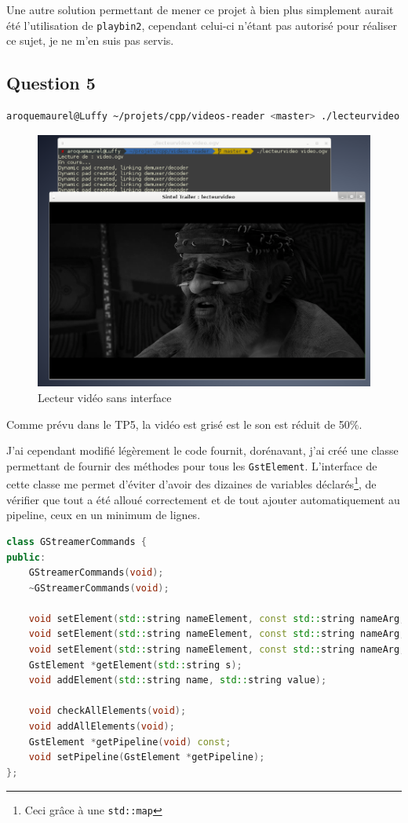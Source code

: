 \documentclass[a4paper, 11pt]{article}
\begin{document}
	Une autre solution permettant de mener ce projet à bien plus simplement aurait été l'utilisation de \texttt{playbin2}, cependant celui-ci n'étant pas
	autorisé pour réaliser ce sujet, je ne m'en suis pas
	servis. 

	\subsection{Question 5}
	\begin{lstlisting}[language=sh]
 aroquemaurel@Luffy ~/projets/cpp/videos-reader <master> ./lecteurvideo video.ogv 
	\end{lstlisting}
	\begin{figure}[H]
		\centering
		\includegraphics[width=17cm]{img/1.png}
		\caption{Lecteur vidéo sans interface}
	\end{figure}
	Comme prévu dans le TP5, la vidéo est grisé est le son est réduit de 50\%. 

	J'ai cependant modifié légèrement le code fournit, dorénavant, j'ai créé une classe permettant de fournir des méthodes pour tous les \texttt{GstElement}.
	L'interface de cette classe me permet d'éviter d'avoir des dizaines de variables déclarés\footnote{Ceci grâce à une \texttt{std::map}}, de vérifier que tout a été alloué correctement et de tout ajouter
	automatiquement au pipeline, ceux en un minimum de lignes.
	
	\begin{lstlisting}[language=C++, caption=Interface de gestion des commandes GStreamer]
class GStreamerCommands {
public:
	GStreamerCommands(void);
	~GStreamerCommands(void);

	void setElement(std::string nameElement, const std::string nameArg, const std::string valuePropertie);
	void setElement(std::string nameElement, const std::string nameArg, const double valuePropertie);
	void setElement(std::string nameElement, const std::string nameArg, const bool valuePropertie);
	GstElement *getElement(std::string s);
	void addElement(std::string name, std::string value);

	void checkAllElements(void);
	void addAllElements(void);
	GstElement *getPipeline(void) const;
	void setPipeline(GstElement *getPipeline);
};
	\end{lstlisting}
\end{document}
